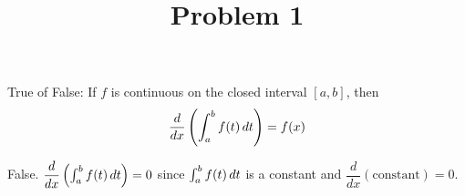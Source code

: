 \documentclass{ximera}
\title[Problem 1]{Problem 1}
\begin{document}
\begin{abstract} \end{abstract}
\maketitle


\begin{problem}
  True of False: If $f$ is continuous on the closed interval $[a,b]$,
  then
  $$\dfrac{d}{dx} \left( \int_a^b f(t) \,d t \right) = f(x)$$
  \begin{explanation}
    False.  $\dfrac{d}{dx} \left( \int_a^b f(t) \,d t \right) = 0$
    since $\int_a^b f(t) \,d t$ is a constant and
    $\dfrac{d}{dx} (\text{constant}) = 0$.
  \end{explanation}
\end{problem}
\end{document}
